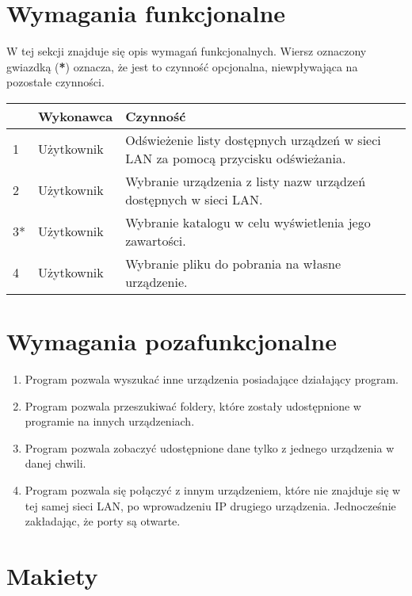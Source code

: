 \documentclass[12pt,a4paper]{article}
\begin{document}
\section{Wymagania funkcjonalne}
W tej sekcji znajduje się opis wymagań funkcjonalnych. Wiersz oznaczony gwiazdką (\textbf{*}) oznacza, że jest to czynność opcjonalna, niewpływająca na pozostałe czynności.

\begin{center}
	\begin{tabular}{|l|p{5em}|p{30em}|}
	\hline 
	 & Wykonawca & Czynność \\ 
	\hline 
	1 & Użytkownik & Odświeżenie listy dostępnych urządzeń w sieci LAN za pomocą przycisku odświeżania. \\ 
	\hline 
	2 & Użytkownik & Wybranie urządzenia z listy nazw urządzeń dostępnych w sieci LAN. \\ 
	\hline 
	3* & Użytkownik & Wybranie katalogu w celu wyświetlenia jego zawartości. \\
	\hline
	4 & Użytkownik & Wybranie pliku do pobrania na własne urządzenie. \\
	\hline
	
	\end{tabular} 
\end{center}

\section{Wymagania pozafunkcjonalne}

\begin{enumerate}
	\item Program pozwala wyszukać inne urządzenia posiadające działający program.
	\item Program pozwala przeszukiwać foldery, które zostały udostępnione w programie na innych urządzeniach.
	\item Program pozwala zobaczyć udostępnione dane tylko z jednego urządzenia w danej chwili.
	\item Program pozwala się połączyć z innym urządzeniem, które nie znajduje się w tej samej sieci LAN, po wprowadzeniu IP drugiego urządzenia. Jednocześnie zakładając, że porty są otwarte.

\end{enumerate}

\section{Makiety}
\end{document}
